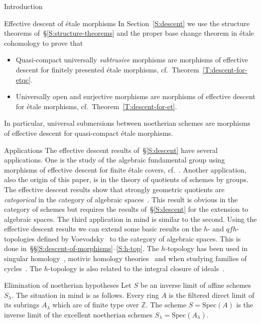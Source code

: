 \documentclass[a4paper,twoside,11pt]{amsart}[2009/07/02] %
\newcommand{\pref}[1]{\eqref{#1}}
\newcommand{\Z}{\mathbb{Z}}
\newcommand{\etale}{\'{e}tale}
\newcommand{\Spec}{\mathrm{Spec}}
\begin{document}
\begin{section}{Introduction}
\begin{subsection}{Effective descent of \'etale morphisms}
In Section~\ref{S:descent} we use the structure theorems
of~\S\ref{S:structure-theorems} and the proper base change theorem in \etale{}
cohomology to prove that
%
\begin{itemize}
\item Quasi-compact universally \emph{subtrusive} morphisms are morphisms of
effective descent for finitely presented \etale{}
morphisms, cf.\ Theorem~\pref{T:descent-for-etqc}.
\item Universally open and surjective morphisms are morphisms of effective
descent for \etale{} morphisms, cf.\ Theorem~\pref{T:descent-for-et}.
\end{itemize}
%
In particular, universal submersions between noetherian schemes are morphisms
of effective descent for quasi-compact \etale{} morphisms.
\end{subsection}

\begin{subsection}{Applications}
The effective descent results of~\S\ref{S:descent} have several applications.
One is the study of the algebraic fundamental group using morphisms of
effective descent for finite \etale{} covers, cf.~\cite[Exp.~IX, \S
5]{sga1}. Another application, also the origin of this paper, is in the theory
of quotients of schemes by groups. The effective descent results show that
strongly geometric quotients are \emph{categorical} in the category of
algebraic spaces~\cite{rydh_finite_quotients}. This result is obvious in the
category of schemes but requires the results of~\S\ref{S:descent} for the
extension to algebraic spaces. The third application in mind is similar to the
second. Using the effective descent results we can extend some basic results on
the $h$- and $qfh$-topologies defined by Voevodsky~\cite{voevodsky_homology} to
the category of algebraic spaces. This is done
in~\S\S\ref{S:descent-of-morphisms}--\ref{S:h-top}. The $h$-topology has been
used in singular homology~\cite{voevodsky-suslin_sing-hom}, motivic homology
theories~\cite{voevodsky_motives} and when studying families of
cycles~\cite{voevodsky_cycles}. The $h$-topology is also related to the
integral closure of ideals~\cite{brenner_Groth-top}.
\end{subsection}

\begin{subsection}{Elimination of noetherian hypotheses}
Let $S$ be an inverse limit of affine schemes $S_\lambda$. The situation in
mind is as follows. Every ring $A$ is the filtered direct limit of its
subrings $A_\lambda$ which are of finite type over $\Z$. The scheme
$S=\Spec(A)$ is the inverse limit of the excellent noetherian schemes
$S_\lambda=\Spec(A_\lambda)$.


\end{subsection}
\end{section}
\end{document}

